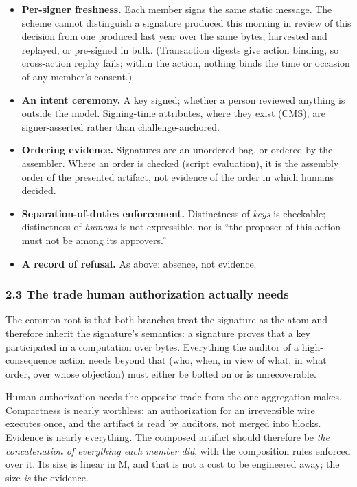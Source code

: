 \documentclass[
  11pt,
]{article}
\providecommand{\tightlist}{%
  \setlength{\itemsep}{0pt}\setlength{\parskip}{0pt}}
\begin{document}
\begin{itemize}
\tightlist
\item
  \textbf{Per-signer freshness.} Each member signs the same static
  message. The scheme cannot distinguish a signature produced this
  morning in review of this decision from one produced last year over
  the same bytes, harvested and replayed, or pre-signed in bulk.
  (Transaction digests give action binding, so cross-action replay
  fails; within the action, nothing binds the time or occasion of any
  member's consent.)
\item
  \textbf{An intent ceremony.} A key signed; whether a person reviewed
  anything is outside the model. Signing-time attributes, where they
  exist (CMS), are signer-asserted rather than challenge-anchored.
\item
  \textbf{Ordering evidence.} Signatures are an unordered bag, or
  ordered by the assembler. Where an order is checked (script
  evaluation), it is the assembly order of the presented artifact, not
  evidence of the order in which humans decided.
\item
  \textbf{Separation-of-duties enforcement.} Distinctness of
  \emph{keys} is checkable; distinctness of \emph{humans} is not
  expressible, nor is ``the proposer of this action must not be among
  its approvers.''
\item
  \textbf{A record of refusal.} As above: absence, not evidence.
\end{itemize}

\subsubsection{2.3 The trade human authorization actually
needs}\label{the-trade}

The common root is that both branches treat the signature as the atom
and therefore inherit the signature's semantics: a signature proves that
a key participated in a computation over bytes. Everything the auditor
of a high-consequence action needs beyond that (who, when, in view of
what, in what order, over whose objection) must either be bolted on or
is unrecoverable.

Human authorization needs the opposite trade from the one aggregation
makes. Compactness is nearly worthless: an authorization for an
irreversible wire executes once, and the artifact is read by auditors,
not merged into blocks. Evidence is nearly everything. The composed
artifact should therefore be \emph{the concatenation of everything each
member did}, with the composition rules enforced over it. Its size is
linear in M, and that is not a cost to be engineered away; the size
\emph{is} the evidence.
\end{document}
